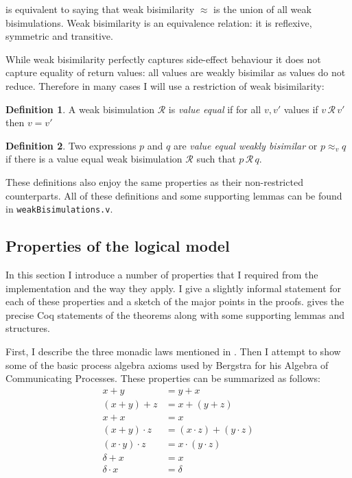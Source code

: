 \documentclass[12pt,twoside,notitlepage]{report}
\theoremstyle{plain}%
\theoremstyle{definition}
\newtheorem{defn}{Definition}[section]
\theoremstyle{remark}
\begin{document}
 is equivalent to saying that weak bisimilarity $ \approx  $ is the union of all weak bisimulations. Weak bisimilarity is an equivalence relation: it is reflexive, symmetric and transitive.

While weak bisimilarity perfectly captures side-effect behaviour it does not capture equality of return values: all values are weakly bisimilar as values do not reduce. Therefore in many cases I will use a restriction of weak bisimilarity:

\begin{defn}
\label{defn:ve_weak_bisim}
A weak bisimulation $ \mathcal{R} $ is \textit{value equal} if for all $ v, v' $ values if $ v\,\mathcal{R}\,v' $ then $ v = v' $
\end{defn}

\begin{defn}
\label{defn:ve_weak_bisimilarity}
Two expressions $ p $ and $ q $ are \textit{value equal weakly bisimilar} or $ p\approx_v q $ if there is a value equal weak bisimulation $ \mathcal{R} $ such that $ p\, \mathcal{R} \, q $.
\end{defn}

These definitions also enjoy the same properties as their non-restricted counterparts. All of these definitions and some supporting lemmas can be found in \verb|weakBisimulations.v|.
\subsection{Properties of the logical model}

In this section I introduce a number of properties that I required from the implementation and the way they apply. I give a slightly informal statement for each of these properties and a sketch of the major points in the proofs.  gives the precise Coq statements of the theorems along with some supporting lemmas and structures. 

First, I describe the three monadic laws mentioned in . Then I attempt to show some of the basic process algebra axioms used by Bergstra for his Algebra of Communicating Processes\cite{bergstra1986algebra,bergstra1984process}. These properties can be summarized as follows:
\begin{align}
x + y &= y + x \label{eq:fork_comm}\\
(x + y) + z &= x + (y + z) \label{eq:fork_assoc}\\
x + x &= x \label{eq:choice_id}\\
(x + y)\cdot z &= (x \cdot z) + (y \cdot z) \label{eq:fork_bind_distribute}\\
(x \cdot y)\cdot z &= x \cdot (y \cdot z) \label{eq:bind_assoc}\\
\delta + x &= x \label{eq:fork_deadlock} \\
\delta \cdot x &= \delta \label{eq:bind_deadlock}
\end{align}
\end{document}
